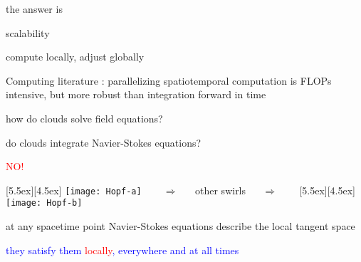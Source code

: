 \begin{frame}{the answer is}

\vfill

{\Huge
scalability
                  }

\vfill

\end{frame}


\begin{frame}{compute locally, adjust globally}

Computing literature : parallelizing {\color{red}spatiotemporal}
computation is FLOPs intensive, but more robust than
integration forward in time
\end{frame}


\begin{frame}{how do clouds solve field equations?}

do clouds integrate Navier-Stokes equations?

\begin{center}
\centerline{\textcolor{red}{\Huge NO!}}

\begin{minipage}[t]{\textwidth}
	\begin{center}
\centerline{
\raisebox{-4.0ex}[5.5ex][4.5ex]
		 {\texttt{[image: Hopf-a]}}
~~~ $\Longrightarrow$ ~~ {other swirls} ~~ $\Longrightarrow$ ~~~
	\raisebox{-4.0ex}[5.5ex][4.5ex]
		 {\texttt{[image: Hopf-b]}}
          }
	\end{center}
\end{minipage}
\end{center}

at any spacetime point Navier-Stokes equations describe the local tangent space

\bigskip

\centerline{
\textcolor{blue}{they satisfy them \textcolor{red}{\large locally}, everywhere and at all times}
}
\end{frame}


